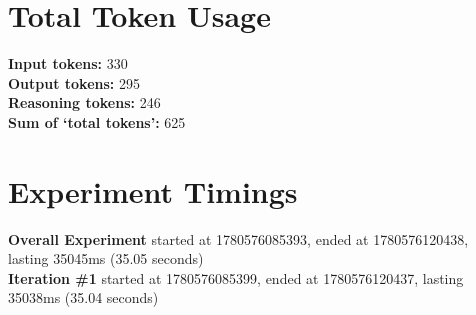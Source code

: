 \documentclass{article}
\begin{document}
\section*{Total Token Usage}
\textbf{Input tokens: }330
\\\textbf{Output tokens: }295
\\\textbf{Reasoning tokens: }246
\\\textbf{Sum of `total tokens': }625
\section*{Experiment Timings}
\textbf{Overall Experiment} started at 1780576085393, ended at 1780576120438, lasting 35045ms (35.05 seconds)
\\\textbf{Iteration \#1} started at 1780576085399, ended at 1780576120437, lasting 35038ms (35.04 seconds)
\end{document}
